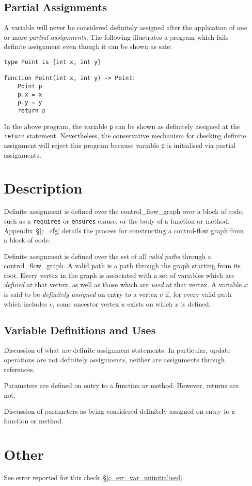 \subsection{Partial Assignments}

A variable will never be considered definitely assigned after the application of one or more {\em partial assignments}.  The following illustrates a program which fails definite assignment even though it can be shown as safe:

\begin{lstlisting}
type Point is {int x, int y}

function Point(int x, int y) -> Point:
    Point p
    p.x = x
    p.y = y
    return p
\end{lstlisting}

In the above program, the variable \lstinline{p} can be shown as definitely assigned at the \lstinline{return} statement.  Nevertheless, the conservative mechanism for checking definite assignment will reject this program because variable \lstinline{p} is initialised via partial assignments.  

\section{Description}

Definite assignment is defined over the \gls{control_flow_graph} over a block of code, such as a \lstinline{requires} or \lstinline{ensures} clause, or the body of a function or method.  Appendix~\S\ref{c_cfg} details the process for constructing a control-flow graph from a block of code.

Definite assignment is defined over the set of all {\em valid paths} through a \gls{control_flow_graph}.  A valid path is a path through the graph starting from its root.  Every vertex in the graph is associated with a set of variables which are {\em defined} at that vertex, as well as those which are {\em used} at that vertex.  A variable $x$ is said to be {\em definitely assigned} on entry to a vertex $v$ if, for every valid path which includes $v$, some ancestor vertex $u$ exists on which $x$ is defined.

\subsection{Variable Definitions and Uses}

Discussion of what are definite assignment statements.  In particular, update operations are not definitely assignments, neither are assignments through references.

Parameters are defined on entry to a function or method.  However, returns are not.

Discussion of parameters as being considered definitely assigned on entry to a function or method.

\section{Other}

See error reported for this check~\S\ref{c_err_var_uninitialised}.

